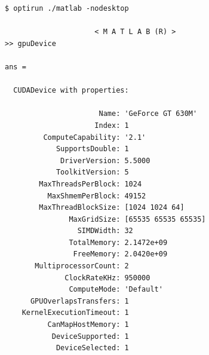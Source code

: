 \documentclass[a4paper,10pt]{article}
\begin{document}
\begin{verbatim}
$ optirun ./matlab -nodesktop 

                     < M A T L A B (R) > 
>> gpuDevice 

ans =  

  CUDADevice with properties: 

                      Name: 'GeForce GT 630M'
                     Index: 1 
         ComputeCapability: '2.1'
            SupportsDouble: 1 
             DriverVersion: 5.5000 
            ToolkitVersion: 5 
        MaxThreadsPerBlock: 1024
          MaxShmemPerBlock: 49152
        MaxThreadBlockSize: [1024 1024 64]
               MaxGridSize: [65535 65535 65535] 
                 SIMDWidth: 32 
               TotalMemory: 2.1472e+09 
                FreeMemory: 2.0420e+09 
       MultiprocessorCount: 2 
              ClockRateKHz: 950000
               ComputeMode: 'Default' 
      GPUOverlapsTransfers: 1 
    KernelExecutionTimeout: 1 
          CanMapHostMemory: 1 
           DeviceSupported: 1 
            DeviceSelected: 1 
\end{verbatim}
\end{document}
